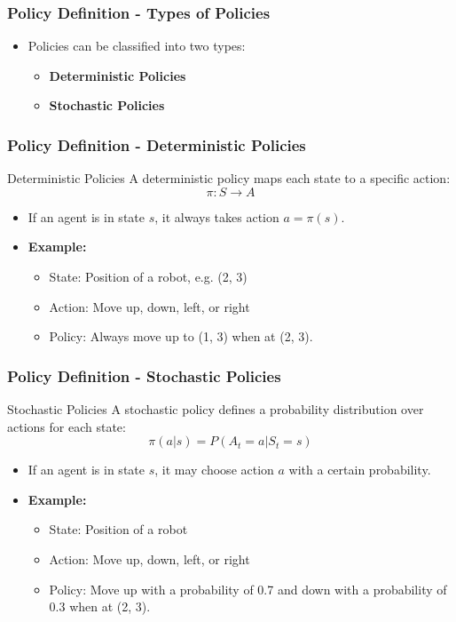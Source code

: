 \documentclass[aspectratio=169]{beamer}
\begin{document}
\begin{frame}[fragile]
    \frametitle{Policy Definition - Types of Policies}
    \begin{itemize}
        \item Policies can be classified into two types:
            \begin{itemize}
                \item \textbf{Deterministic Policies}
                \item \textbf{Stochastic Policies}
            \end{itemize}
    \end{itemize}
\end{frame}

\begin{frame}[fragile]
    \frametitle{Policy Definition - Deterministic Policies}
    \begin{block}{Deterministic Policies}
        A deterministic policy maps each state to a specific action:
        \[
        \pi: S \rightarrow A
        \]
        \begin{itemize}
            \item If an agent is in state \( s \), it always takes action \( a = \pi(s) \).
            \item \textbf{Example:}
            \begin{itemize}
                \item State: Position of a robot, e.g. (2, 3)
                \item Action: Move up, down, left, or right
                \item Policy: Always move up to (1, 3) when at (2, 3).
            \end{itemize}
        \end{itemize}
    \end{block}
\end{frame}

\begin{frame}[fragile]
    \frametitle{Policy Definition - Stochastic Policies}
    \begin{block}{Stochastic Policies}
        A stochastic policy defines a probability distribution over actions for each state:
        \[
        \pi(a|s) = P(A_t = a | S_t = s)
        \]
        \begin{itemize}
            \item If an agent is in state \( s \), it may choose action \( a \) with a certain probability.
            \item \textbf{Example:}
            \begin{itemize}
                \item State: Position of a robot
                \item Action: Move up, down, left, or right
                \item Policy: Move up with a probability of 0.7 and down with a probability of 0.3 when at (2, 3).
            \end{itemize}
        \end{itemize}
    \end{block}
\end{frame}
\end{document}
